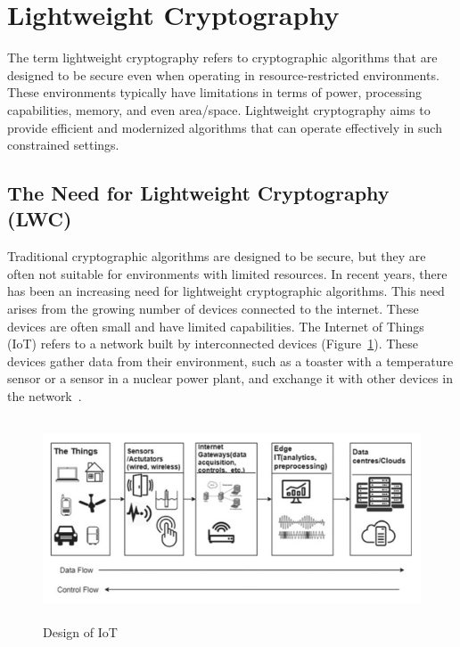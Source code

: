 \section{Lightweight Cryptography}
The term lightweight cryptography refers to cryptographic algorithms that are designed to be secure even when operating in resource-restricted environments. These environments typically have limitations in terms of power, processing capabilities, memory, and even area/space. Lightweight cryptography aims to provide efficient and modernized algorithms that can operate effectively in such constrained settings.



\subsection{The Need for Lightweight Cryptography (LWC)}
Traditional cryptographic algorithms are designed to be secure, but they are often not suitable for environments with limited resources. In recent years, there has been an increasing need for lightweight cryptographic algorithms. This need arises from the growing number of devices connected to the internet. These devices are often small and have limited capabilities.
\newline
The Internet of Things (IoT) refers to a network built by interconnected devices (Figure~\ref{fig:IoT}). These devices gather data from their environment, such as a toaster with a temperature sensor or a sensor in a nuclear power plant, and exchange it with other devices in the network~\cite{chauhan2022analysis}.

\begin{figure}[h]
    \centering
    \includegraphics[width=14.0cm, height=6.0cm]{media/DesignofInternetofThings(IoT).png}
    \caption{Design of IoT}
    \label{fig:IoT}
\end{figure}

